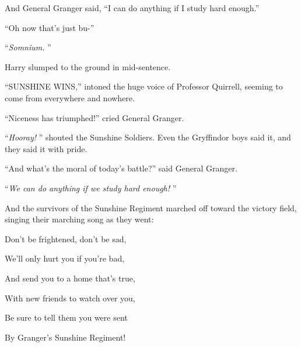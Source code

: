 And General Granger said, ``I can do anything if I study hard enough.''

``Oh now that's just bu-''

``\emph{Somnium.} ''

Harry slumped to the ground in mid-sentence.

``SUNSHINE WINS,'' intoned the huge voice of Professor Quirrell, seeming
to come from everywhere and nowhere.

``Niceness has triumphed!'' cried General Granger.

``\emph{Hooray!} '' shouted the Sunshine Soldiers. Even the Gryffindor
boys said it, and they said it with pride.

``And what's the moral of today's battle?'' said General Granger.

``\emph{We can do anything if we study hard enough!} ''

And the survivors of the Sunshine Regiment marched off toward the
victory field, singing their marching song as they went:

Don't be frightened, don't be sad,

We'll only hurt you if you're bad,

And send you to a home that's true,

With new friends to watch over you,

Be sure to tell them you were sent

By Granger's Sunshine Regiment!
